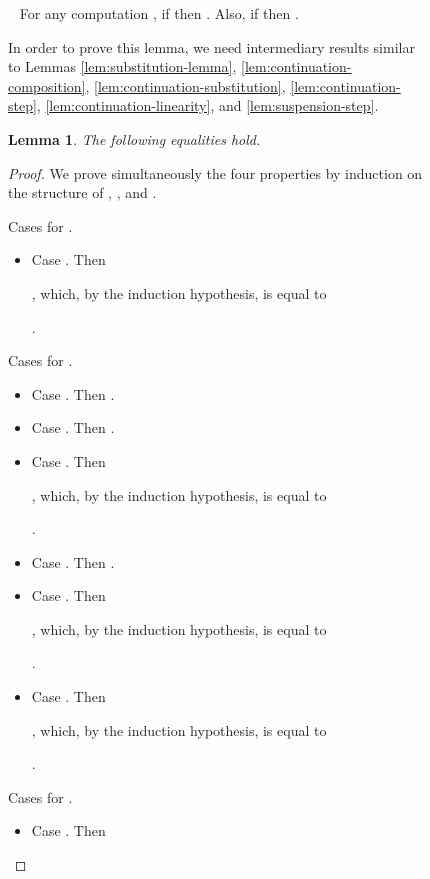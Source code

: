 \documentclass{LMCS}
\newtheorem{lemma}[theorem]{Lemma}
\newcommand{\recap}[2]{\medskip\noindent{\bf #1 \ref{#2}.}~}
\begin{document}
\begin{figure}
{\recap{Lemma}{lem:inverse-step-a} For any computation , if 
then . Also, if 
then .

\bigskip
In order to prove this lemma, we need intermediary results similar to Lemmas \ref{lem:substitution-lemma}, \ref{lem:continuation-composition}, \ref{lem:continuation-substitution}, \ref{lem:continuation-step}, \ref{lem:continuation-linearity}, and \ref{lem:suspension-step}.

\begin{lemma}
  \label{lem:substitution-lemma-a} The following equalities hold.
  \begin{myenumerate}
    \item {}
    \item 
    \item {}
    \item 
  \end{myenumerate}
\end{lemma}
\begin{proof}
  We prove simultaneously the four properties by induction on the structure of , ,  and .
  \begin{myenumerate}
    \item Cases for .
      \begin{itemize}
	\item Case . Then 
	  
	  ,
	  which, by the induction hypothesis, is equal to
	  
	  .
      \end{itemize}
    \item Cases for .
      \begin{itemize}
	\item Case . Then .
	\item Case . Then .
	\item Case . Then 
	  
	  ,
	  which, by the induction hypothesis, is equal to
	  
	  .

	\item Case . Then .
	\item Case . Then 
	  
	  ,
	  which, by the induction hypothesis, is equal to
	  
	  .

	\item Case . Then 
	  
	  ,
	  which, by the induction hypothesis, is equal to
	  
	  .
      \end{itemize}
    \item Cases for .
      \begin{itemize}
	\item Case . Then 
	  

\end{itemize}
\end{myenumerate}
\end{proof}}
\end{figure}
\end{document}
